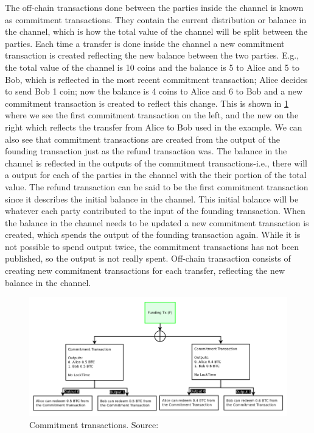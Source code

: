The off-chain transactions done between the parties inside the channel is known as commitment transactions. 
They contain the current distribution or balance in the channel, which is how the total value of the channel will be split between the parties. Each time a transfer is done inside the channel a new commitment transaction is created reflecting the new balance between the two parties. E.g., the total value of the channel is 10 coins and the balance is 5 to Alice and 5 to Bob, which is reflected in the most recent commitment transaction; Alice decides to send Bob 1 coin; now the balance is 4 coins to Alice and 6 to Bob and a new commitment transaction is created to reflect this change. This is shown in \cref{fig:ln_commit} where we see the first commitment transaction on the left, and the new on the right which reflects the transfer from Alice to Bob used in the example. We can also see that commitment transactions are created from the output of the founding transaction just as the refund transaction was. The balance in the channel is reflected in the outputs of the commitment transactions-i.e., there will a output for each of the parties in the channel with the their portion of the total value.
The refund transaction can be said to be the first commitment transaction since it describes the initial balance in the channel. This initial balance will be whatever each party contributed to the input of the founding transaction. 
When the balance in the channel needs to be updated a new commitment transaction is created, which spends the output of the founding transaction again. While it is not possible to spend output twice, the commitment transactions has not been published, so the output is not really spent. Off-chain transaction consists of creating new commitment transactions for each transfer, reflecting the new balance in the channel.

\begin{figure}[ht]
    \centering
    \includegraphics[width=12cm]{figures/ln_commit.png}
    \caption{Commitment transactions. Source:~\cite{poon2015bitcoin}}
    \label{fig:ln_commit}
\end{figure}

